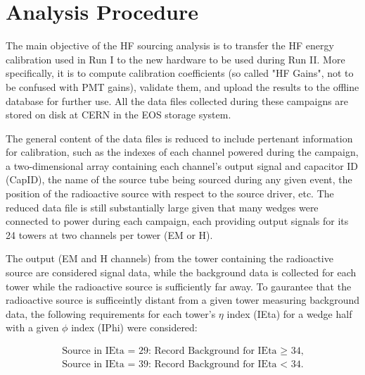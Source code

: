 \section{Analysis Procedure}
The main objective of the HF sourcing analysis is to transfer the HF energy
calibration used in Run I to the new hardware to be used during Run II. More
specifically, it is to compute calibration coefficients (so called "HF
Gains", not to be confused with PMT gains), validate them, and upload the
results to the offline database for further use. All the data files
collected during these campaigns are stored on disk at CERN in the EOS
storage system.

The general content of the data files is reduced to include pertenant
information for calibration, such as the indexes of each channel powered
during the campaign, a two-dimensional array containing each channel's
output signal and capacitor ID (CapID), the name of the source tube being
sourced during any given event, the position of the radioactive source
with respect to the source driver, etc. The reduced data file is still
substantially large given that many wedges were connected to power during
each campaign, each providing output signals for its 24 towers at two
channels per tower (EM or H).

The output (EM and H channels) from the tower containing the
radioactive source are considered signal data, while the background data
is collected for each tower while the radioactive source is sufficiently
far away. To gaurantee that the radioactive source is sufficeintly distant
from a given tower measuring background data, the following requirements for each tower's $\eta$ index (IEta) for a wedge half with a given $\phi$ index (IPhi) were considered:
\begin{center}
   \begin{eqnarray}
      \label{eq:Tower_Cuts}
      \textrm{Source in IEta = 29: Record Background for IEta $\ge$ 34,} \\
      \textrm{Source in IEta = 39: Record Background for IEta $<$ 34.} \nonumber
   \end{eqnarray}
\end{center}

